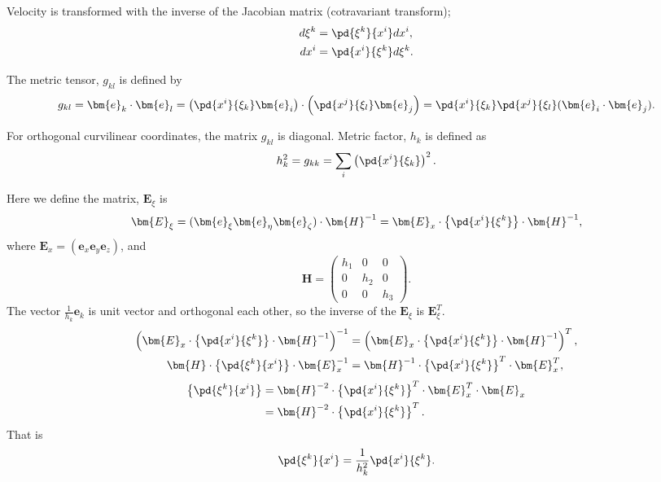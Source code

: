 \documentclass{book}
\begin{document}
Velocity is transformed with the inverse of the Jacobian matrix (cotravariant transform);
\begin{align}
  d\xi^k &= \pd{\xi^k}{x^i} dx^i, \\
  dx^i &= \pd{x^i}{\xi^k} d\xi^k.
\end{align}



The metric tensor, $g_{kl}$ is defined by
\begin{equation}
  g_{kl} = \bm{e}_k \cdot \bm{e}_l
  = \left(\pd{x^i}{\xi_k}\bm{e}_i\right) \cdot \left(\pd{x^j}{\xi_l}\bm{e}_j\right)
  = \pd{x^i}{\xi_k}\pd{x^j}{\xi_l} (\bm{e}_i\cdot\bm{e}_j).
\end{equation}

For orthogonal curvilinear coordinates, the matrix ${g_{kl}}$ is diagonal.
Metric factor, $h_k$ is defined as
\begin{equation}
  h_k^2 = g_{kk} = \sum_i \left(\pd{x^i}{\xi_k}\right)^2.
\end{equation}

Here we define the matrix, $\bm{E}_\xi$ is
\begin{equation}
  \bm{E}_\xi =
  (\bm{e}_\xi \bm{e}_\eta \bm{e}_\zeta)\cdot \bm{H}^{-1}
  = \bm{E}_x \cdot \left\{\pd{x^i}{\xi^k}\right\} \cdot \bm{H}^{-1},
\end{equation}
where $\bm{E}_x = (\bm{e}_x \bm{e}_y \bm{e}_z)$, and
\begin{equation}
  \bm{H} = \left(\begin{array}{ccc} h_1 & 0 & 0\\ 0 & h_2 & 0\\ 0 & 0 & h_3\end{array}\right).
\end{equation}
The vector $\frac{1}{h_k}\bm{e}_k$ is unit vector and orthogonal each other,
so the inverse of the $\bm{E}_\xi$ is $\bm{E}_\xi^T$.
\begin{align}
  \left( \bm{E}_x \cdot \left\{\pd{x^i}{\xi^k}\right\} \cdot \bm{H}^{-1} \right)^{-1} &= \left( \bm{E}_x \cdot \left\{\pd{x^i}{\xi^k}\right\} \cdot \bm{H}^{-1} \right)^T, \nonumber\\
  \bm{H} \cdot \left\{\pd{\xi^k}{x^i}\right\} \cdot \bm{E}_x^{-1} &= \bm{H}^{-1} \cdot \left\{\pd{x^i}{\xi^k}\right\}^T \cdot \bm{E}_x^T, \nonumber
\end{align}
\begin{align}
  \left\{\pd{\xi^k}{x^i}\right\} &= \bm{H}^{-2} \cdot \left\{\pd{x^i}{\xi^k}\right\}^T \cdot \bm{E}_x^T \cdot \bm{E}_x \nonumber \\
  &= \bm{H}^{-2} \cdot \left\{\pd{x^i}{\xi^k}\right\}^T.
\end{align}
That is
\begin{equation}
  \pd{\xi^k}{x^i} = \frac{1}{h_k^2} \pd{x^i}{\xi^k}.
\end{equation}
\end{document}
